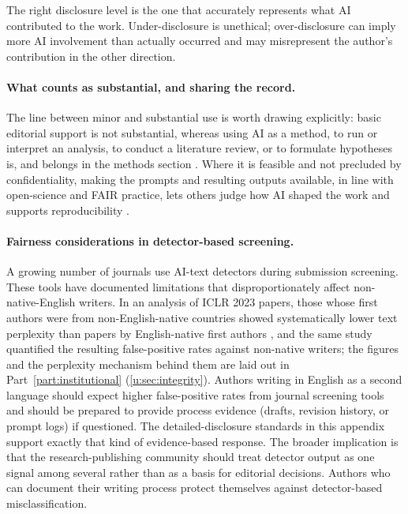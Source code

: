 \documentclass{SIAMbook2023}
\begin{document}
The right disclosure level is the one that accurately represents what AI contributed to the work. Under-disclosure is unethical; over-disclosure can imply more AI involvement than actually occurred and may misrepresent the author's contribution in the other direction.

\paragraph{What counts as substantial, and sharing the record.}
The line between minor and substantial use is worth drawing explicitly: basic editorial support is not substantial, whereas using AI as a method, to run or interpret an analysis, to conduct a literature review, or to formulate hypotheses is, and belongs in the methods section \citep{europeancommission2026living}. Where it is feasible and not precluded by confidentiality, making the prompts and resulting outputs available, in line with open-science and FAIR practice, lets others judge how AI shaped the work and supports reproducibility \citep{helmy2025ten}.

\paragraph{Fairness considerations in detector-based screening.}
A growing number of journals use AI-text detectors during submission screening. These tools have documented limitations that disproportionately affect non-native-English writers. In an analysis of ICLR 2023 papers, those whose first authors were from non-English-native countries showed systematically lower text perplexity than papers by English-native first authors \citep{liang2023gpt}, and the same study quantified the resulting false-positive rates against non-native writers; the figures and the perplexity mechanism behind them are laid out in Part~\ref{part:institutional} (\cref{u:sec:integrity}). Authors writing in English as a second language should expect higher false-positive rates from journal screening tools and should be prepared to provide process evidence (drafts, revision history, or prompt logs) if questioned. The detailed-disclosure standards in this appendix support exactly that kind of evidence-based response. The broader implication is that the research-publishing community should treat detector output as one signal among several rather than as a basis for editorial decisions. Authors who can document their writing process protect themselves against detector-based misclassification.
\end{document}
